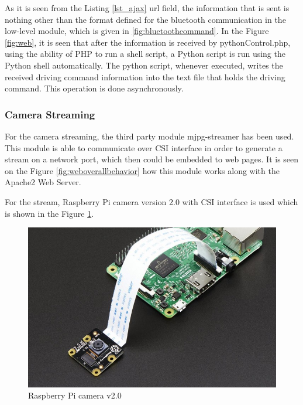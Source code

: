 

As it is seen from the Listing \ref{lst_ajax} url field, the information that is sent is nothing other than the format defined for the bluetooth communication in the low-level module, which is given in \ref{fig:bluetoothcommand}. In the Figure \ref{fig:web}, it is seen that after the information is received by pythonControl.php, using the ability of PHP to run a shell script, a Python script is run using the Python shell automatically. The python script, whenever executed, writes the received driving command information into the text file that holds the driving command. This operation is done asynchronously. 
\subsubsection{Camera Streaming}
For the camera streaming, the third party module mjpg-streamer \cite{mjpgstreamergithub} has been used. This module is able to communicate over CSI interface in order to generate a stream on a network port, which then could be embedded to web pages. It is seen on the Figure \ref{fig:weboverallbehavior} how this module works along with the Apache2 Web Server. 

For the stream, Raspberry Pi camera version 2.0 with CSI interface is used which is shown in the Figure \ref{fig:rpicam20}.

\begin{figure}[!ht]
	\centering
	\includegraphics[scale=0.5]{content/images/rpicam20.jpg}
	\caption{Raspberry Pi camera v2.0}
	\label{fig:rpicam20}
\end{figure}

